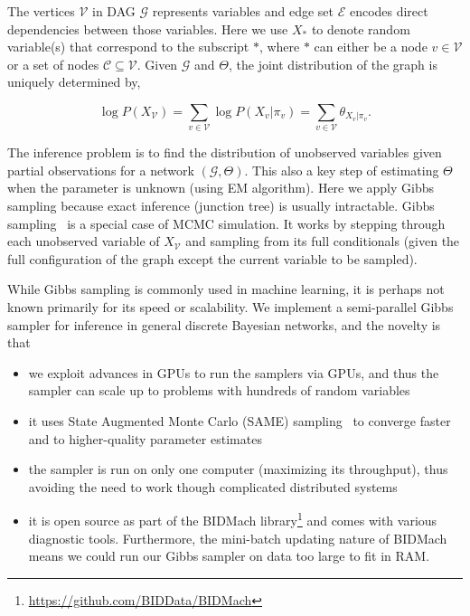 \documentclass{article} %
\begin{document}
The vertices $\mathcal{V}$ in DAG $\mathcal{G}$ represents variables and edge set $\mathcal{E}$
encodes direct dependencies between those variables.  Here we use $X_{*}$ to denote random
variable(s) that correspond to the subscript $*$, where $*$ can either be a node $v \in \mathcal{V}$
or a set of nodes $\mathcal{C} \subseteq \mathcal{V}$. Given $\mathcal{G}$ and $\Theta$, the joint
distribution of the graph is uniquely determined by,

\begin{equation}\label{eq:log_prob}
\log P(X_{\mathcal{V}}) = \sum\limits_{v \in \mathcal{V}} \log P(X_v | \pi_v) = \sum\limits_{v \in \mathcal{V}} \theta_{X_v | \pi_v}.
\end{equation}

The inference problem is to find the distribution of unobserved variables given partial observations
for a network $(\mathcal{G}, \Theta)$. This also a key step of estimating $\Theta$ when the
parameter is unknown (using EM algorithm). Here we apply Gibbs sampling because exact inference
(junction tree) is usually intractable. Gibbs sampling~\citep{Geman1984} is a special case of MCMC
simulation. It works by stepping through each unobserved variable of $X_{\mathcal{V}}$ and sampling
from its full conditionals (given the full configuration of the graph except the current variable to
be sampled).

While Gibbs sampling is commonly used in machine learning, it is perhaps not known primarily for its
speed or scalability. We implement a semi-parallel Gibbs sampler for inference in general discrete
Bayesian networks, and the novelty is that

\begin{itemize}[noitemsep]
    \item we exploit advances in GPUs to run the samplers via GPUs, and thus the sampler can scale
    up to problems with hundreds of random variables
    \item it uses State Augmented Monte Carlo (SAME) sampling~\cite{SAME2002} to converge faster and
    to higher-quality parameter estimates 
    \item the sampler is run on only one computer (maximizing its throughput), thus avoiding the
    need to work though complicated distributed systems
    \item it is open source as part of the BIDMach
    library\footnote{\url{https://github.com/BIDData/BIDMach}} and comes with various diagnostic
    tools. Furthermore, the mini-batch updating nature of BIDMach means we could run our Gibbs
    sampler on data too large to fit in RAM.
\end{itemize}
\end{document}
